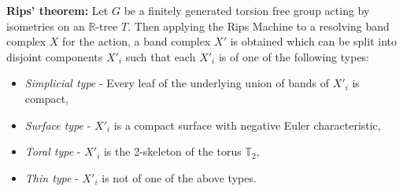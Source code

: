 \begin{theorem}\label{rips}
    \textbf{Rips' theorem:} Let $G$ be a finitely generated torsion free group acting by isometries on an $\mathbb{R}$-tree $T$. Then applying the Rips Machine to a resolving band complex $X$ for the action, a band complex $X'$ is obtained which can be split into disjoint components $X'_i$ such that each $X'_i$ is of one of the following types:
    \begin{itemize}
        \item \emph{Simplicial type} - Every leaf of the underlying union of bands of $X'_i$ is compact,
        \item \emph{Surface type} - $X'_i$ is a compact surface with negative Euler characteristic,
        \item \emph{Toral type} - $X'_i$ is the 2-skeleton of the torus $\mathbb{T}_2$,
        \item \emph{Thin type} - $X'_i$ is not of one of the above types.
    \end{itemize}
\end{theorem}


